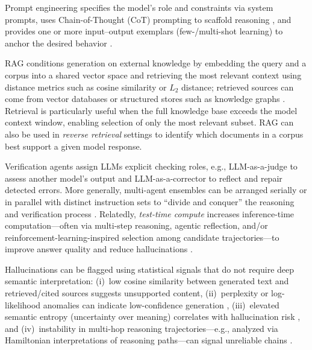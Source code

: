 \begin{description}[style=unboxed,leftmargin=1em,labelindent=0pt]
    \item[Prompt-based.] Prompt engineering specifies the model's role and constraints via system prompts, uses Chain-of-Thought (CoT) prompting to scaffold reasoning \citep{wei2022chain}, and provides one or more input--output exemplars (few-/multi-shot learning) to anchor the desired behavior \citep{brown2020language}.

    \item[Retrieval-Augmented Generation.] RAG conditions generation on external knowledge by embedding the query and a corpus into a shared vector space and retrieving the most relevant context using distance metrics such as cosine similarity or $L_2$ distance; retrieved sources can come from vector databases or structured stores such as knowledge graphs \citep{lewis2020retrieval}. Retrieval is particularly useful when the full knowledge base exceeds the model context window, enabling selection of only the most relevant subset. RAG can also be used in \emph{reverse retrieval} settings to identify which documents in a corpus best support a given model response.

    \item[System orchestration.] Verification agents assign LLMs explicit checking roles, e.g., LLM-as-a-judge to assess another model's output and LLM-as-a-corrector to reflect and repair detected errors. More generally, multi-agent ensembles can be arranged serially or in parallel with distinct instruction sets to ``divide and conquer'' the reasoning and verification process \citep{shinn2024reflexion}. Relatedly, \emph{test-time compute} increases inference-time computation---often via multi-step reasoning, agentic reflection, and/or reinforcement-learning-inspired selection among candidate trajectories---to improve answer quality and reduce hallucinations \citep{openai2024reasoning, guo2025deepseek}.

    \item[Context-insensitive metrics.] Hallucinations can be flagged using statistical signals that do not require deep semantic interpretation: (i)~low cosine similarity between generated text and retrieved/cited sources suggests unsupported content, (ii)~perplexity or log-likelihood anomalies can indicate low-confidence generation \citep{varshney2023stitch}, (iii)~elevated semantic entropy (uncertainty over meaning) correlates with hallucination risk \citep{farquhar2024detecting}, and (iv)~instability in multi-hop reasoning trajectories---e.g., analyzed via Hamiltonian interpretations of reasoning paths---can signal unreliable chains \citep{marin2024optimizing}.
\end{description}

